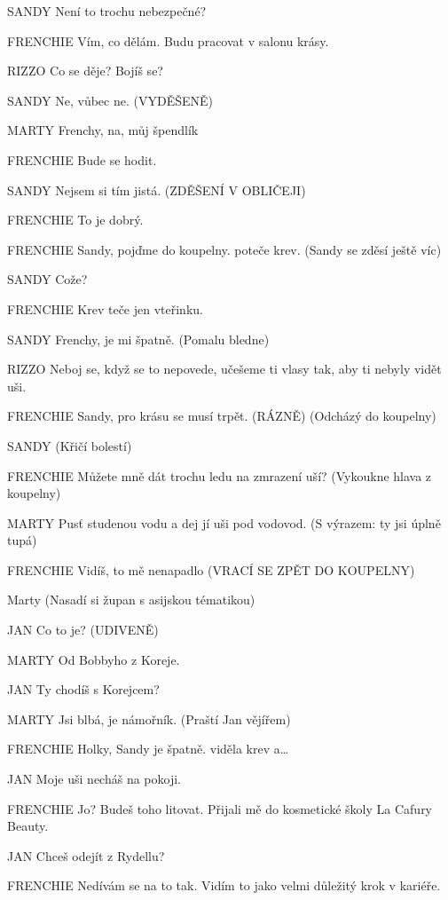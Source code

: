 SANDY        Není to trochu nebezpečné?

FRENCHIE        Vím, co dělám. Budu pracovat v salonu krásy.

RIZZO        Co se děje? Bojíš se?

SANDY        Ne, vůbec ne. (VYDĚŠENĚ)

MARTY        Frenchy, na, můj špendlík

FRENCHIE        Bude se hodit. 

SANDY        Nejsem si tím jistá. (ZDĚŠENÍ V OBLIČEJI)

FRENCHIE        To je dobrý. 

FRENCHIE        Sandy, pojďme do koupelny. poteče krev. (Sandy se zděsí ještě víc)

SANDY        Cože?

FRENCHIE        Krev teče jen vteřinku.

SANDY        Frenchy, je mi špatně. (Pomalu bledne)

RIZZO        Neboj se, když se to nepovede, učešeme ti vlasy tak, aby ti nebyly vidět         uši.

FRENCHIE        Sandy, pro krásu se musí trpět. (RÁZNĚ) (Odcházý do koupelny) 

SANDY        (Křičí bolestí)

FRENCHIE        Můžete mně dát trochu ledu na zmrazení uší? (Vykoukne hlava z                 koupelny)

MARTY        Pusť studenou vodu a dej jí uši pod vodovod. (S výrazem: ty jsi úplně         tupá) 

FRENCHIE        Vidíš, to mě nenapadlo (VRACÍ SE ZPĚT DO KOUPELNY)

 Marty  (Nasadí si župan s asijskou tématikou)

JAN        Co to je? (UDIVENĚ)

MARTY        Od Bobbyho z Koreje.

JAN        Ty chodíš s Korejcem? 

MARTY        Jsi blbá, je námořník. (Praští Jan vějířem) 

FRENCHIE        Holky, Sandy je špatně. viděla krev a…

JAN        Moje uši necháš na pokoji.

FRENCHIE        Jo? Budeš toho litovat. Přijali mě do kosmetické školy La Cafury Beauty.

JAN        Chceš odejít z Rydellu?

FRENCHIE        Nedívám se na to tak. Vidím to jako velmi důležitý krok v kariéře.

